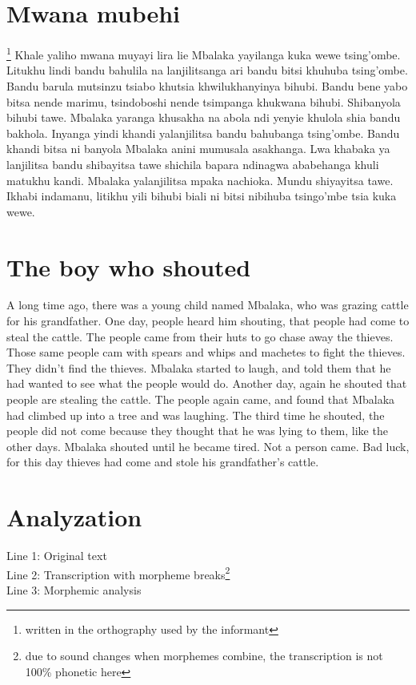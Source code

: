 \section{Mwana mubehi}\footnote{written in the orthography used by the informant}
Khale yaliho mwana muyayi lira lie Mbalaka yayilanga kuka wewe tsing’\-ombe.  Litukhu lindi bandu bahulila na lanjilitsanga ari bandu bitsi khuhuba tsing’ombe.  Bandu barula mutsinzu tsiabo khutsia khwilukhanyinya bihubi.  Bandu bene yabo bitsa nende marimu, tsindoboshi nende tsimpanga khukwana bihubi.  Shibanyola bihubi tawe.  Mbalaka yaranga khusakha na abola ndi yenyie khulola shia bandu bakhola.  Inyanga yindi khandi yalanjilitsa bandu bahubanga tsing’ombe.  Bandu khandi bitsa ni banyola Mbalaka anini mumusala asakhanga.  Lwa khabaka ya lanjilitsa bandu shibayitsa tawe shichila bapara ndinagwa ababehanga khuli matukhu kandi.  Mbalaka yalanjilitsa mpaka nachioka.  Mundu shiyayitsa tawe.  Ikhabi indamanu, litikhu yili bihubi biali ni bitsi nibihuba tsingo’mbe tsia kuka wewe.

\section{The boy who shouted}
A long time ago, there was a young child named Mbalaka, who was grazing cattle for his grandfather.  One day, people heard him shouting, that people had come to steal the cattle.  The people came from their huts to go chase away the thieves.  Those same people cam with spears and whips and machetes to fight the thieves.  They didn't find the thieves.  Mbalaka started to laugh, and told them that he had wanted to see what the people would do.  Another day, again he shouted that people are stealing the cattle.  The people again came, and found that Mbalaka had climbed up into a tree and was laughing.  The third time he shouted, the people did not come because they thought that he was lying to them, like the other days.  Mbalaka shouted until he became tired.  Not a person came.  Bad luck, for this day thieves had come and stole his grandfather's cattle.

\section{Analyzation}

\noindent Line 1: Original text\\
Line 2: Transcription with morpheme breaks\footnote{due to sound changes when morphemes combine, the transcription is not 100\% phonetic here}\\
Line 3: Morphemic analysis


